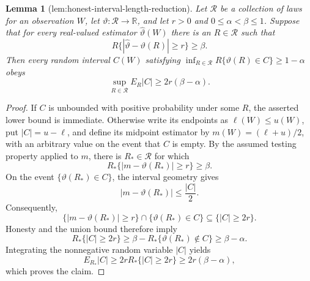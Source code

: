 \documentclass{article}
\newtheorem{lemma}{Lemma}
\begin{document}
\begin{lemma}[lem:honest-interval-length-reduction]\label{lem:honest-interval-length-reduction}
Let \(\mathscr R\) be a collection of laws for an observation \(W\), let \(\vartheta:\mathscr R\to\mathbb R\), and let \(r>0\) and \(0\le\alpha<\beta\le1\).  Suppose that for every real-valued estimator \(\widehat\vartheta(W)\) there is an \(R\in\mathscr R\) such that
\[
 R\{|\widehat\vartheta-\vartheta(R)|\ge r\}\ge\beta.
\]
Then every random interval \(C(W)\) satisfying
\(\inf_{R\in\mathscr R}R\{\vartheta(R)\in C\}\ge1-\alpha\) obeys
\[
 \sup_{R\in\mathscr R}E_R|C|\ge2r(\beta-\alpha).
\]
\end{lemma}
\begin{proof}
If \(C\) is unbounded with positive probability under some \(R\), the asserted lower bound is immediate.  Otherwise write its endpoints as \(\ell(W)\le u(W)\), put \(|C|=u-\ell\), and define its midpoint estimator by \(m(W)=(\ell+u)/2\), with an arbitrary value on the event that \(C\) is empty.  By the assumed testing property applied to \(m\), there is \(R_*\in\mathscr R\) for which
\[
 R_*\{|m-\vartheta(R_*)|\ge r\}\ge\beta.
\]
On the event \(\{\vartheta(R_*)\in C\}\), the interval geometry gives
\[
 |m-\vartheta(R_*)|\le \frac{|C|}{2}.
\]
Consequently,
\[
 \{|m-\vartheta(R_*)|\ge r\}\cap
 \{\vartheta(R_*)\in C\}
 \subseteq \{|C|\ge2r\}.
\]
Honesty and the union bound therefore imply
\[
 R_*\{|C|\ge2r\}
 \ge \beta-R_*\{\vartheta(R_*)\notin C\}
 \ge\beta-\alpha.
\]
Integrating the nonnegative random variable \(|C|\) yields
\[
 E_{R_*}|C|\ge2rR_*\{|C|\ge2r\}
 \ge2r(\beta-\alpha),
\]
which proves the claim.
\end{proof}
\end{document}

